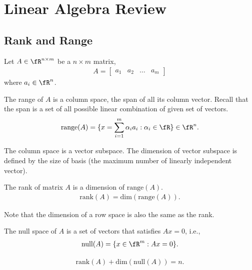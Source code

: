 \documentclass{article}
\begin{document}


\section{Linear Algebra Review} 

\subsection{Rank and Range} \label{subsec:rank}
Let $A\in\fR^{n\times m}$ be a $n\times m$ matrix,
\begin{align}
    A = \begin{bmatrix} a_1&a_2&\dots &a_m\end{bmatrix}
\end{align}
where $a_i\in\fR^n$.
\begin{definition}
The range of $A$ is a column space, the span of all its column vector.
Recall that the span is a set of all possible linear combination of given set of vectors.
\begin{align}
    \mbox{range}(A) = \{x = \sum_{i=1}^m \alpha_i a_i : \alpha_i\in\fR\}\in\fR^n.
\end{align}
\end{definition}
The column space is a vector subspace.
The dimension of vector subspace is defined by the size of basis (the maximum number of linearly independent vector).
\begin{definition}
The rank of matrix $A$ is a dimension of $\mbox{range}(A)$.
\begin{align}
    \mbox{rank}(A) = \mbox{dim}(\mbox{range}(A)).
\end{align}
\end{definition}
Note that the dimension of a row space is also the same as the rank.

\begin{definition}
    The null space of $A$ is a set of vectors that satisfies $Ax = 0$, i.e.,
    \begin{align}
        \mbox{null}(A) = \{x \in\fR^{m}: Ax = 0\}.
    \end{align}
\end{definition}

\begin{theorem}
    \begin{align}
        \mbox{rank}(A) + \mbox{dim}(\mbox{null}(A)) = n. 
    \end{align}
\end{theorem}
\end{document}
